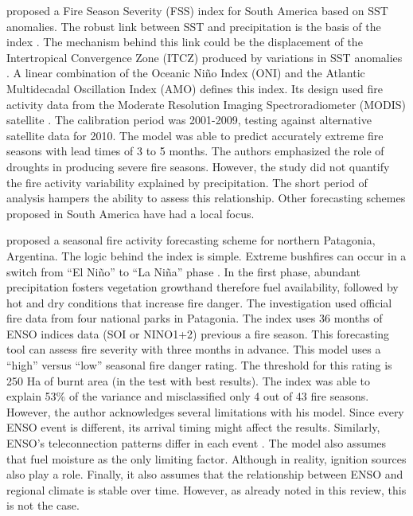 \citet{Chen2011} proposed a Fire Season Severity (FSS) index for
South America based on SST anomalies. The robust link between SST
and precipitation is the basis of the index \citep{Kousky1984,Ropelewski1987,Fernandes2011}.
The mechanism behind this link could be the displacement of the Intertropical
Convergence Zone (ITCZ) produced by variations in SST anomalies \citep{Zeng2008}.
A linear combination of the Oceanic Ni\~no Index (ONI) and the Atlantic
Multidecadal Oscillation Index (AMO) defines this index. Its design
used fire activity data from the Moderate Resolution Imaging Spectroradiometer
(MODIS) satellite \citep{Justice2002}. The calibration period was
2001-2009, testing against alternative satellite data for 2010. The
model was able to predict accurately extreme fire seasons with lead
times of 3 to 5 months. The authors emphasized the role of droughts
in producing severe fire seasons. However, the study did not quantify
the fire activity variability explained by precipitation. The short
period of analysis hampers the ability to assess this relationship.
Other forecasting schemes proposed in South America have had a local
focus.

\citet{Kitzberger2002} proposed a seasonal fire activity forecasting
scheme for northern Patagonia, Argentina. The logic behind the index
is simple. Extreme bushfires can occur in a switch from \textquotedblleft El
Ni\~no\textquotedblright{} to \textquotedblleft La Ni\~na\textquotedblright{}
phase \citep{Baisan1990,Swetnam1990,Kitzberger1997,Veblen1999}. In
the first phase, abundant precipitation fosters vegetation growth\textemdash and
therefore fuel availability\textemdash , followed by hot and dry conditions
that increase fire danger. The investigation used official fire data
from four national parks in Patagonia. The index uses 36 months of
ENSO indices data (SOI or NINO1+2) previous a fire season. This forecasting
tool can assess fire severity with three months in advance. This model
uses a \textquotedblleft high\textquotedblright{} versus \textquotedblleft low\textquotedblright{}
seasonal fire danger rating. The threshold for this rating is 250
Ha of burnt area (in the test with best results). The index was able
to explain 53\% of the variance and misclassified only 4 out of 43
fire seasons. However, the author acknowledges several limitations
with his model. Since every ENSO event is different, its arrival timing
might affect the results. Similarly, ENSO's teleconnection patterns
differ in each event \citep{Villalba1994}. The model also assumes
that fuel moisture as the only limiting factor. Although in reality,
ignition sources also play a role. Finally, it also assumes that the
relationship between ENSO and regional climate is stable over time.
However, as already noted in this review, this is not the case. 

